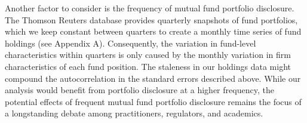 \par Another factor to consider is the frequency of mutual fund portfolio disclosure. The Thomson Reuters database provides quarterly snapshots of fund portfolios, which we keep constant between quarters to create a monthly time series of fund holdings (see Appendix A). Consequently, the variation in fund-level characteristics within quarters is only caused by the monthly variation in firm characteristics of each fund position. The staleness in our holdings data might compound the autocorrelation in the standard errors described above. While our analysis would benefit from portfolio disclosure at a higher frequency, the potential effects of frequent mutual fund portfolio disclosure remains the focus of a longstanding debate among practitioners, regulators, and academics.


